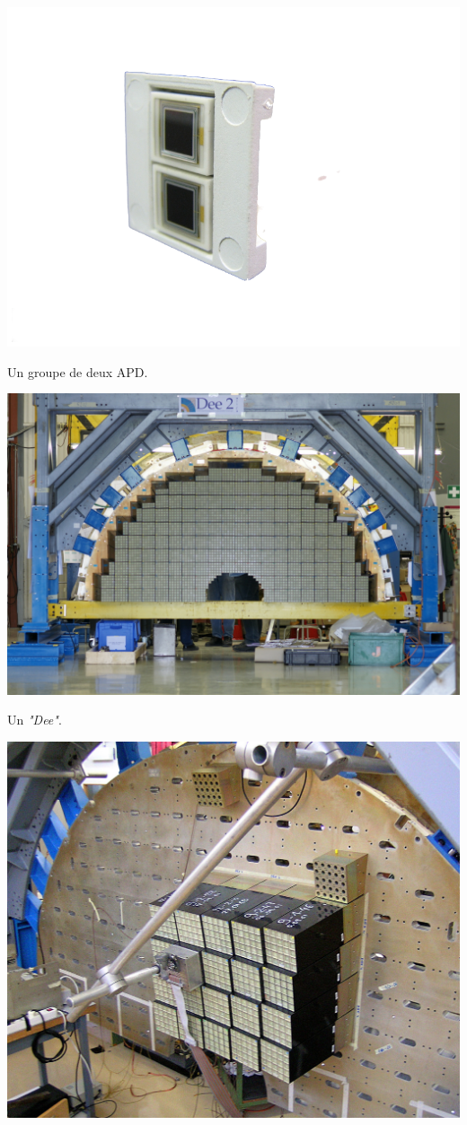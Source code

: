 \begin{itemize}[label=$\bullet$]
	\marginpar
	{
		\centering
		\includegraphics[width=\marginparwidth]{CMS/APD.png}
		\captionsetup{type=figure}\caption{Un groupe de deux APD.}
		\label{APD}
	}
	\marginpar
	{
		\centering
		\includegraphics[width=\marginparwidth]{CMS/dee.jpg}
		\captionsetup{type=figure}\caption{Un \textit{"Dee"}.}
		\label{DEE}
	}
	\marginpar
	{
		\centering
		\includegraphics[width=\marginparwidth]{CMS/20SCs.jpg}
}
\end{itemize}
